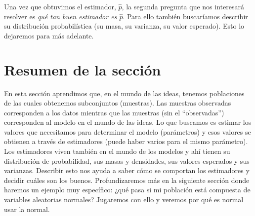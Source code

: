 \documentclass[
]{book}
\begin{document}
Una vez que obtuvimos el estimador, \(\hat{p}\), la segunda pregunta que nos interesará resolver es \emph{qué tan buen estimador es \(\hat{p}\)}. Para ello también buscaríamos describir su distribución probabilística (su masa, su varianza, su valor esperado). Esto lo dejaremos para más adelante.

\hypertarget{resumen-de-la-secciuxf3n}{%
\section{Resumen de la sección}\label{resumen-de-la-secciuxf3n}}

En esta sección aprendimos que, en el mundo de las ideas, tenemos poblaciones de las cuales obtenemos subconjuntos (muestras). Las muestras observadas corresponden a los datos mientras que las muestras (sin el ``observadas'') corresponden al modelo en el mundo de las ideas. Lo que buscamos es estimar los valores que necesitamos para determinar el modelo (parámetros) y esos valores se obtienen a través de estimadores (puede haber varios para el mismo parámetro). Los estimadores viven también en el mundo de los modelos y ahí tienen su distribución de probabilidad, sus masas y densidades, sus valores esperados y sus varianzas. Describir esto nos ayuda a saber cómo se comportan los estimadores y decidir cuáles son los buenos. Profundizaremos más en la siguiente sección donde haremos un ejemplo muy específico: ¿qué pasa si mi población está compuesta de variables aleatorias normales? Jugaremos con ello y veremos por qué es normal usar la normal.

  
\end{document}
